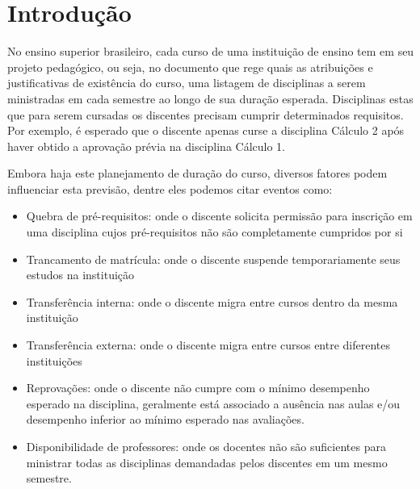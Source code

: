 
\chapter[Introdução]{Introdução}


No ensino superior brasileiro, cada curso de uma instituição de ensino tem em seu projeto pedagógico, ou seja, no documento que rege quais as atribuições e justificativas de existência do curso, uma listagem de disciplinas a serem ministradas em cada semestre ao longo de sua duração esperada. Disciplinas estas que para serem cursadas os discentes precisam cumprir determinados requisitos. Por exemplo, é esperado que o discente apenas curse a disciplina Cálculo 2 após haver obtido a aprovação prévia na disciplina Cálculo 1.


Embora haja este planejamento de duração do curso, diversos fatores podem influenciar esta previsão, dentre eles podemos citar eventos como:

\begin{itemize}
    \item Quebra de pré-requisitos: onde o discente solicita permissão para inscrição em uma disciplina cujos pré-requisitos não são completamente cumpridos por si
    \item Trancamento de matrícula: onde o discente suspende temporariamente seus estudos na instituição
    \item Transferência interna: onde o discente migra entre cursos dentro da mesma instituição
    \item Transferência externa: onde o discente migra entre cursos entre diferentes instituições
    \item Reprovações: onde o discente não cumpre com o mínimo desempenho esperado na disciplina, geralmente está associado a ausência nas aulas e/ou desempenho inferior ao mínimo esperado nas avaliações.
    \item  Disponibilidade de professores: onde os docentes não são suficientes para ministrar todas as disciplinas demandadas pelos discentes em um mesmo semestre.
\end{itemize}

